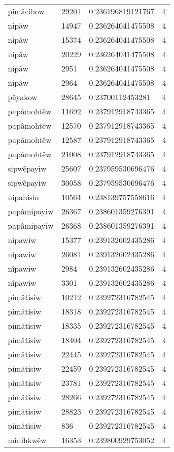 \begin{longtable}{llll}
pimâcihow & 29201 & 0.236196819121767 & 4 \\
nipâw & 14947 & 0.236264041475508 & 4 \\
nipâw & 15374 & 0.236264041475508 & 4 \\
nipâw & 20229 & 0.236264041475508 & 4 \\
nipâw & 2951 & 0.236264041475508 & 4 \\
nipâw & 2964 & 0.236264041475508 & 4 \\
pêyakow & 28645 & 0.23700112453281 & 4 \\
papâmohtêw & 11692 & 0.237912918743365 & 4 \\
papâmohtêw & 12570 & 0.237912918743365 & 4 \\
papâmohtêw & 12587 & 0.237912918743365 & 4 \\
papâmohtêw & 21008 & 0.237912918743365 & 4 \\
sipwêpayiw & 25607 & 0.237959530696476 & 4 \\
sipwêpayiw & 30058 & 0.237959530696476 & 4 \\
nipahisin & 10564 & 0.238139757558616 & 4 \\
papâmipayiw & 26367 & 0.238601359276391 & 4 \\
papâmipayiw & 26368 & 0.238601359276391 & 4 \\
nîpawiw & 15377 & 0.239132602435286 & 4 \\
nîpawiw & 26081 & 0.239132602435286 & 4 \\
nîpawiw & 2984 & 0.239132602435286 & 4 \\
nîpawiw & 3301 & 0.239132602435286 & 4 \\
pimâtisiw & 10212 & 0.239272316782545 & 4 \\
pimâtisiw & 18318 & 0.239272316782545 & 4 \\
pimâtisiw & 18335 & 0.239272316782545 & 4 \\
pimâtisiw & 18404 & 0.239272316782545 & 4 \\
pimâtisiw & 22445 & 0.239272316782545 & 4 \\
pimâtisiw & 22459 & 0.239272316782545 & 4 \\
pimâtisiw & 23781 & 0.239272316782545 & 4 \\
pimâtisiw & 28266 & 0.239272316782545 & 4 \\
pimâtisiw & 28823 & 0.239272316782545 & 4 \\
pimâtisiw & 836 & 0.239272316782545 & 4 \\
minihkwêw & 16353 & 0.239800929753052 & 4 \\

\end{longtable}
